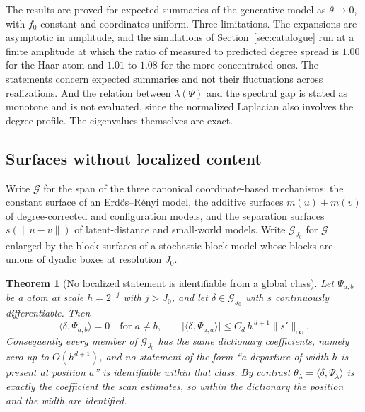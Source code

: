 \documentclass[11pt]{article}
\newtheorem{theorem}{Theorem}[section]
\theoremstyle{definition}
\newcommand{\1}{\mathbf 1}\newcommand{\op}{\operatorname}
\begin{document}
The results are proved for expected summaries of the generative model as
$\theta\to0$, with $f_0$ constant and coordinates uniform.  Three limitations.
The expansions are asymptotic in amplitude, and the simulations of
Section~\ref{sec:catalogue} run at a finite amplitude at which the ratio of
measured to predicted degree spread is $1.00$ for the Haar atom and $1.01$
to $1.08$ for the more concentrated ones.  The statements concern expected
summaries and not their fluctuations across realizations.  And the relation
between $\lambda(\Psi)$ and the spectral gap is stated as monotone and is not
evaluated, since the normalized Laplacian also involves the degree profile.
The eigenvalues themselves are exact.


\subsection{Surfaces without localized content}           \label{app:sec-thy-invis}


Write $\mathcal G$ for the span of the three canonical coordinate-based
mechanisms: the constant surface of an Erd\H os--R\'enyi model, the additive
surfaces $m(u)+m(v)$ of degree-corrected and configuration models, and the
separation surfaces $s(\|u-v\|)$ of latent-distance and small-world models.
Write $\mathcal G_{J_0}$ for $\mathcal G$ enlarged by the block surfaces of a
stochastic block model whose blocks are unions of dyadic boxes at resolution
$J_0$.

\begin{theorem}[No localized statement is identifiable from a global class]
\label{thm:noloc}
Let $\Psi_{a,b}$ be a atom at scale $h=2^{-j}$ with $j>J_0$, and
let $\delta\in\mathcal G_{J_0}$ with $s$ continuously differentiable.  Then
\[
\langle\delta,\Psi_{a,b}\rangle=0\quad\text{for }a\ne b,
\qquad
\bigl|\langle\delta,\Psi_{a,a}\rangle\bigr|\le C_d\,h^{\,d+1}\|s'\|_\infty .
\]
Consequently every member of $\mathcal G_{J_0}$ has the same dictionary
coefficients, namely zero up to $O(h^{d+1})$, and no statement of the form
``a departure of width $h$ is present at position $a$'' is identifiable within
that class.  By contrast $\theta_\lambda=\langle\delta,\Psi_\lambda\rangle$ is
exactly the coefficient the scan estimates, so within the dictionary the
position and the width are identified.
\end{theorem}
\end{document}
